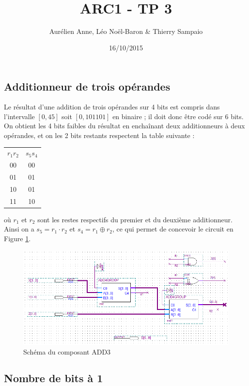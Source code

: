 \documentclass[a4paper,11pt]{article}
\title{ARC1 - TP 3}
\author{Aurélien Anne, Léo Noël-Baron \& Thierry Sampaio}
\date{16/10/2015}
\begin{document}
\maketitle

\subsection*{Additionneur de trois opérandes}

Le résultat d'une addition de trois opérandes sur 4 bits est compris dans l'intervalle $[0, 45]$ soit $[0, 101101]$ en binaire ; il doit donc être codé sur 6 bits. On obtient les 4 bits faibles du résultat en enchaînant deux additionneurs à deux opérandes, et on les 2 bits restants respectent la table suivante :
\begin{table}[h]\centering
\begin{tabular}{c|c}
$r_1r_2$ & $s_5s_4$ \\
00 & 00 \\
01 & 01 \\
10 & 01 \\
11 & 10
\end{tabular}\end{table}

où $r_1$ et $r_2$ sont les restes respectifs du premier et du deuxième additionneur. Ainsi on a $s_5=r_1\cdot r_2$ et $s_4=r_1\oplus r_2$, ce qui permet de concevoir le circuit en Figure \ref{add3}.

\begin{figure}[h]
\center
\includegraphics[scale=0.6]{add3.PNG}
\caption{Schéma du composant ADD3}
\label{add3}
\end{figure}


\subsection*{Nombre de bits à 1}
\end{document}
